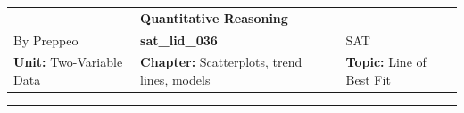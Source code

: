 \documentclass[11pt,paper=a4,answers]{exam}
\begin{document}
\begin{center}
    \centering
    \renewcommand{\arraystretch}{1.5}
    \begin{tabularx}{\textwidth}{YYY}
    & \normalsize\bf{{\Large{{Quantitative Reasoning}}}} & \\
    By Preppeo & \normalsize\bf{{sat\_lid\_036}} & SAT\\
    \normalsize{{\textbf{{Unit:}} Two-Variable Data}} & \normalsize{{\textbf{{Chapter:}} Scatterplots, trend lines, models}} & \normalsize{{\textbf{{Topic:}} Line of Best Fit}} \\
    \end{tabularx}
\end{center}
\par\noindent\rule{\textwidth}{1pt}
\end{document}
